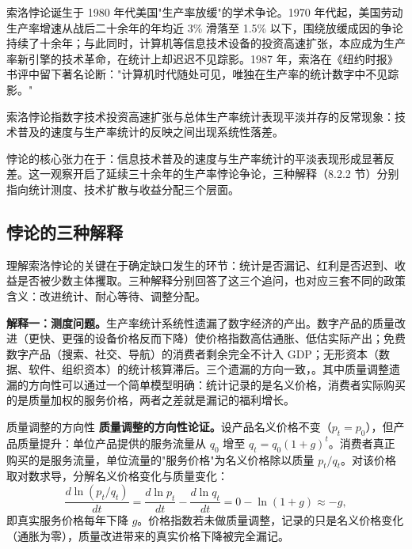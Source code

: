 索洛悖论诞生于 1980 年代美国"生产率放缓"的学术争论。1970 年代起，美国劳动生产率增速从战后二十余年的年均近 3\% 滑落至 1.5\% 以下，围绕放缓成因的争论持续了十余年；与此同时，计算机等信息技术设备的投资高速扩张，本应成为生产率新引擎的技术革命，在统计上却迟迟不见踪影。1987 年，索洛在《纽约时报》书评中留下著名论断："计算机时代随处可见，唯独在生产率的统计数字中不见踪影。"

\begin{definition}
索洛悖论指数字技术投资高速扩张与总体生产率统计表现平淡并存的反常现象：技术普及的速度与生产率统计的反映之间出现系统性落差。
\end{definition}

悖论的核心张力在于：信息技术普及的速度与生产率统计的平淡表现形成显著反差。这一观察开启了延续三十余年的生产率悖论争论，三种解释（8.2.2 节）分别指向统计测度、技术扩散与收益分配三个层面。

\subsection{悖论的三种解释}

理解索洛悖论的关键在于确定缺口发生的环节：统计是否漏记、红利是否迟到、收益是否被少数主体攫取。三种解释分别回答了这三个追问，也对应三套不同的政策含义：改进统计、耐心等待、调整分配。

\textbf{解释一：测度问题。}生产率统计系统性遗漏了数字经济的产出。数字产品的质量改进（更快、更强的设备价格反而下降）使价格指数高估通胀、低估实际产出；免费数字产品（搜索、社交、导航）的消费者剩余完全不计入 GDP；无形资本（数据、软件、组织资本）的统计核算滞后。三个遗漏的方向一致，。其中质量调整遗漏的方向性可以通过一个简单模型明确：统计记录的是名义价格，消费者实际购买的是质量加权的服务价格，两者之差就是漏记的福利增长。

\begin{derivation}{质量调整的方向性}{}
\textbf{质量调整的方向性论证。}设产品名义价格不变（$p_t = p_0$），但产品质量提升：单位产品提供的服务流量从 $q_0$ 增至 $q_t = q_0(1+g)^t$。消费者真正购买的是服务流量，单位流量的"服务价格"为名义价格除以质量 $p_t/q_t$。对该价格取对数求导，分解名义价格变化与质量变化：
\[
\frac{d\ln(p_t/q_t)}{dt} = \frac{d\ln p_t}{dt} - \frac{d\ln q_t}{dt} = 0 - \ln(1+g) \approx -g,
\]
即真实服务价格每年下降 $g$。价格指数若未做质量调整，记录的只是名义价格变化（通胀为零），质量改进带来的真实价格下降被完全漏记。
\end{derivation}

